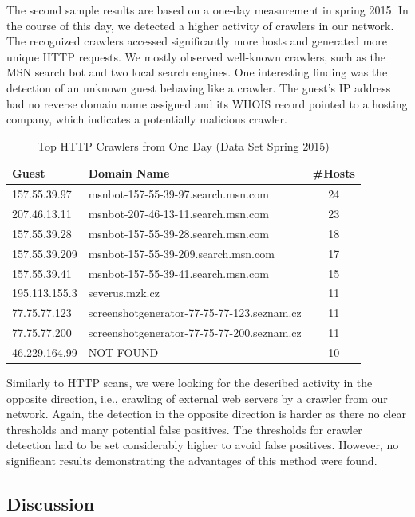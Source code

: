 The second sample results are based on a one-day measurement in spring 2015. In the course of this day, we detected a higher activity of crawlers in our network. The recognized crawlers accessed significantly more hosts and generated more unique HTTP requests. We mostly observed well-known crawlers, such as the MSN search bot and two local search engines. One interesting finding was the detection of an unknown guest behaving like a crawler. The guest's IP address had no reverse domain name assigned and its WHOIS record pointed to a hosting company, which indicates a potentially malicious crawler.

\begin{table}[ht]
\centering
\begin{tabular}{| l | l | c |} \hline
Guest & Domain Name & \#Hosts \\ \hline
157.55.39.97  & msnbot-157-55-39-97.search.msn.com  & 24 \\ \hline
207.46.13.11  & msnbot-207-46-13-11.search.msn.com  & 23 \\ \hline
157.55.39.28  & msnbot-157-55-39-28.search.msn.com  & 18 \\ \hline
157.55.39.209 & msnbot-157-55-39-209.search.msn.com & 17 \\ \hline
157.55.39.41  & msnbot-157-55-39-41.search.msn.com  & 15 \\ \hline
195.113.155.3 & severus.mzk.cz & 11 \\ \hline
77.75.77.123  & screenshotgenerator-77-75-77-123.seznam.cz & 11 \\ \hline
77.75.77.200  & screenshotgenerator-77-75-77-200.seznam.cz & 11 \\ \hline
46.229.164.99 & NOT FOUND & 10 \\ \hline
\end{tabular}
\caption{Top HTTP Crawlers from One Day (Data Set Spring 2015)}
\label{tab:httpsecurity-crawlers2}
\end{table}

Similarly to HTTP scans, we were looking for the described activity in the opposite direction, i.e., crawling of external web servers by a crawler from our network. Again, the detection in the opposite direction is harder as there no clear thresholds and many potential false positives. The thresholds for crawler detection had to be set considerably higher to avoid false positives. However, no significant results demonstrating the advantages of this method were found.


\subsection{Discussion}\label{subsec:httpsecurity-discussion}

